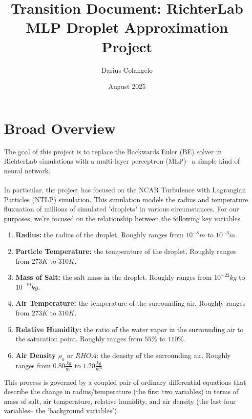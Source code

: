 \documentclass{article}
\begin{document}

\title{Transition Document: RichterLab MLP Droplet Approximation Project}
\author{Darius Colangelo}
\date{August 2025}

\maketitle
\newpage

\tableofcontents
\newpage

\section{Broad Overview}
The goal of this project is to replace the Backwards Euler (BE) solver in RichterLab simulations with a multi-layer perceptron (MLP)-- a simple kind of neural network.\\\\
In particular, the project has focused on the NCAR Turbulence with Lagrangian Particles (NTLP) simulation. This simulation models the radius and temperature fluxuation of millions of simulated "droplets" in various circumstances. For our purposes, we're focused on the relationship between the following key variables
\begin{enumerate}
	\item \textbf{Radius:} the radius of the droplet. Roughly ranges from $10^{-8}m$ to $10^{-3}m$.
	\item \textbf{Particle Temperature:} the temperature of the droplet. Roughly ranges from $273K$ to $310K$.
	\item \textbf{Mass of Salt:} the salt mass in the droplet. Roughly ranges from $10^{-22}kg$ to $10^{-10}kg$.
	\item \textbf{Air Temperature:} the temperature of the surrounding air. Roughly ranges from $273K$ to $310K$.
	\item \textbf{Relative Humidity:} the ratio of the water vapor in the surrounding air to the saturation point. Roughly ranges from $55\%$ to $110\%$.
	\item \textbf{Air Density} $\rho_a$ or $RHOA$: the density of the surrounding air. Roughly ranges from $0.80\frac{kg}{m^3}$ to $1.20\frac{kg}{m^3}$
\end{enumerate}
This process is governed by a coupled pair of ordinary differential equations that describe the change in radius/temperature (the first two variables) in terms of mass of salt, air temperature, relative humidity, and air density (the last four variables-- the `background variables').\\\\
\end{document}
